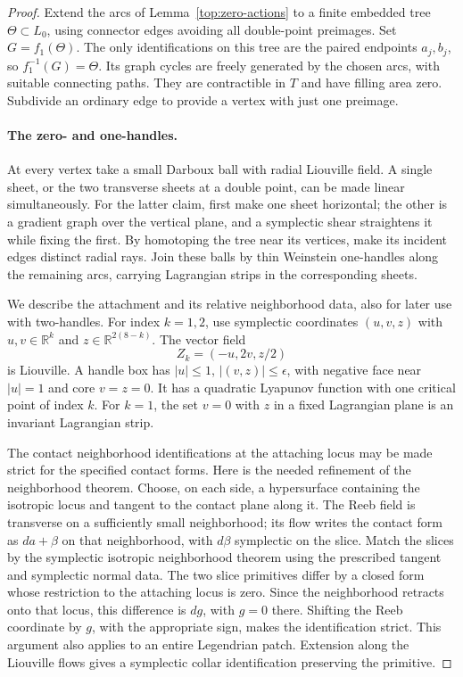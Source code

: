 \documentclass[11pt]{article}
\theoremstyle{definition}
\theoremstyle{remark}
\newcommand{\R}{\mathbb R}
\numberwithin{equation}{section}
\begin{document}
\begin{proof}
Extend the arcs of Lemma~\ref{top:zero-actions} to a finite
embedded tree $\Theta\subset L_0$, using connector edges avoiding
all double-point preimages.  Set $G=f_1(\Theta)$.  The only
identifications on this tree are the paired endpoints $a_j,b_j$,
so $f_1^{-1}(G)=\Theta$.  Its graph cycles are freely generated
by the chosen arcs, with suitable connecting paths.  They are
contractible in $T$ and have filling area zero.  Subdivide an
ordinary edge to provide a vertex with just one preimage.

\paragraph{The zero- and one-handles.}
At every vertex take a small Darboux ball with radial Liouville
field.  A single sheet, or the two transverse sheets at a double
point, can be made linear simultaneously.  For the latter claim,
first make one sheet horizontal; the other is a gradient graph
over the vertical plane, and a symplectic shear straightens it
while fixing the first.  By homotoping the tree near its vertices,
make its incident edges distinct radial rays.  Join these balls by
thin Weinstein one-handles along the remaining arcs, carrying
Lagrangian strips in the corresponding sheets.

We describe the attachment and its relative neighborhood data,
also for later use with two-handles.  For index $k=1,2$, use
symplectic coordinates $(u,v,z)$ with $u,v\in\R^k$ and
$z\in\R^{2(8-k)}$.  The vector field
\begin{equation}\label{top:handle-field}
 Z_k=(-u,2v,z/2)
\end{equation}
is Liouville.  A handle box has $|u|\leq1$,
$|(v,z)|\leq\epsilon$, with negative face near $|u|=1$ and
core $v=z=0$.  It has a quadratic Lyapunov function with one
critical point of index $k$.  For $k=1$, the set $v=0$ with $z$
in a fixed Lagrangian plane is an invariant Lagrangian strip.

The contact neighborhood identifications at the attaching locus
may be made strict for the specified contact forms.  Here is the
needed refinement of the neighborhood theorem.  Choose, on each
side, a hypersurface containing the isotropic locus and tangent
to the contact plane along it.  The Reeb field is transverse on
a sufficiently small neighborhood; its flow writes the contact
form as $da+\beta$ on that neighborhood, with $d\beta$
symplectic on the slice.  Match the slices by the symplectic
isotropic neighborhood theorem using the prescribed tangent and
symplectic normal data.  The two slice primitives differ by a
closed form whose restriction to the attaching locus is zero.
Since the neighborhood retracts onto that locus, this difference
is $dg$, with $g=0$ there.  Shifting the Reeb coordinate by $g$,
with the appropriate sign, makes the identification strict.
This argument also applies to an entire Legendrian patch.
Extension along the Liouville flows gives a symplectic collar
identification preserving the primitive.


\end{proof}
\end{document}
